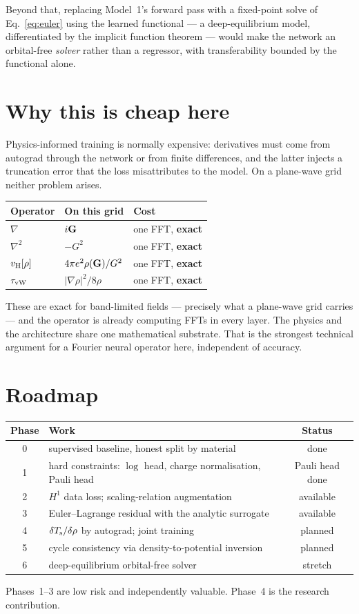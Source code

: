 Beyond that, replacing Model~1's forward pass with a fixed-point solve of
Eq.~\eqref{eq:euler} using the learned functional --- a deep-equilibrium model,
differentiated by the implicit function theorem --- would make the network an
orbital-free \emph{solver} rather than a regressor, with transferability bounded
by the functional alone.

\section{Why this is cheap here}

Physics-informed training is normally expensive: derivatives must come from
autograd through the network or from finite differences, and the latter injects
a truncation error that the loss misattributes to the model. On a plane-wave
grid neither problem arises.

\begin{center}
\begin{tabular}{@{}lll@{}}
\toprule
Operator & On this grid & Cost \\
\midrule
$\nabla$ & $i\mathbf{G}$ & one FFT, \textbf{exact} \\
$\nabla^2$ & $-G^2$ & one FFT, \textbf{exact} \\
$v_{\mathrm{H}}[\rho]$ & $4\pi e^2\rho(\mathbf{G})/G^2$ & one FFT, \textbf{exact} \\
$\tau_{\mathrm{vW}}$ & $|\nabla\rho|^2/8\rho$ & one FFT, \textbf{exact} \\
\bottomrule
\end{tabular}
\end{center}

These are exact for band-limited fields --- precisely what a plane-wave grid
carries --- and the operator is already computing FFTs in every layer. The
physics and the architecture share one mathematical substrate. That is the
strongest technical argument for a Fourier neural operator here, independent of
accuracy.

\section{Roadmap}

\begin{center}
\begin{tabular}{@{}clc@{}}
\toprule
Phase & Work & Status \\
\midrule
0 & supervised baseline, honest split by material & done \\
1 & hard constraints: $\log$ head, charge normalisation, Pauli head & Pauli head done \\
2 & $H^1$ data loss; scaling-relation augmentation & available \\
3 & Euler--Lagrange residual with the analytic surrogate & available \\
4 & $\delta T_{\mathrm{s}}/\delta\rho$ by autograd; joint training & planned \\
5 & cycle consistency via density-to-potential inversion & planned \\
6 & deep-equilibrium orbital-free solver & stretch \\
\bottomrule
\end{tabular}
\end{center}

Phases~1--3 are low risk and independently valuable. Phase~4 is the research
contribution.
